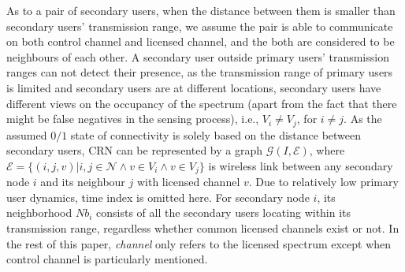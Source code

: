 \documentclass[journal,comsoc]{IEEEtran}
\theoremstyle{mytheoremstyle}
\theoremstyle{mytheoremstyle}
\theoremstyle{mytheoremstyle}
\newcommand{\ie}{i.e., }
\begin{document}
As to a pair of secondary users, when the distance between them is smaller than secondary users' transmission range, we assume the pair is able to communicate on both control channel and licensed channel, and the both are considered to be neighbours of each other.
A secondary user outside primary users' transmission ranges can not detect their presence, as the transmission range of primary users is limited and secondary users are at different locations, secondary users have different views on the occupancy of the spectrum (apart from the fact that there might be false negatives in the sensing process), i.e., $V_i \neq V_j$, for $i \neq j$.
%
As the assumed $0/1$ state of connectivity is solely based on the distance between secondary users, CRN can be represented by a graph $\mathcal{G}(I,\mathcal{E})$, where $\mathcal{E}=\lbrace(i,j,v) \vert i, j \in \mathcal{N} \wedge v\in V_i \wedge v\in V_j \rbrace$ is wireless link between any secondary node $i$ and its neighbour $j$ with licensed channel $v$.
Due to relatively low primary user dynamics, time index is omitted here.
For secondary node $i$, its neighborhood $Nb_i$ consists of all the secondary users locating within its transmission range, regardless whether common licensed channels exist or not. 
In the rest of this paper, \textit{channel} only refers to the licensed spectrum except when control channel is particularly mentioned.
\end{document}
